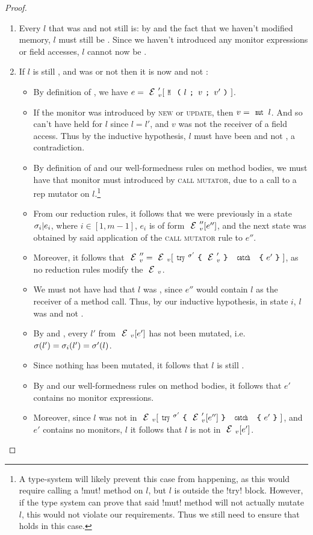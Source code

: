 \begin{proof}
\begin{ienumerate}
\begin{enumerate}
		\item Every \reach $l$ that was \RCN and not \RM still is: 
			by  and the fact that we haven't modified memory, $l$ must still be \RCN. Since we haven't introduced any monitor expressions or field accesses, $l$ cannot now be \RM.
		
		\item If $l$ is still \reach, and was \RM or not \RCN then it is now \RCN and not \RM:
		\begin{itemize}
			\item By definition of \error, we have $e = \EV'[\M{l}{v}{v'}]$.
			
			\item If the monitor was introduced by \textsc{new} or \textsc{update}, then $v = \Kw{mut}\,l$. And so \HNO can't have held for $l$ since $l = l'$, and $v$ was not the receiver of a field access.
			Thus by the inductive hypothesis, $l$ must have been \RCN and not \RM, a contradiction.
			\item By definition of \VS and our well-formedness rules on method bodies, we must have that monitor must introduced by \textsc{call mutator}, due to a call to a rep mutator on $l$.\footnote{
				A type-system will likely prevent this case from happening, 
				as this would require calling a \Q!mut! method on $l$, but $l$ is \reach outside the \Q!try! block. However, if the type system can prove that said \Q!mut! method will not actually mutate $l$, this would not violate our requirements.
				Thus we still need to ensure that  holds in this case.}
			\item From our reduction rules, it follows that we were previously in a state $\sigma_i|e_i$, where $i \in [1, m - 1]$, $e_i$ is of form $\EV''[e'']$, and the next state was obtained by said application of the \textsc{call mutator} rule to $e''$.
			\item Moreover, it follows that $\EV''= \EV[\trys{\s'}{\EV'}{e'}]$, as no reduction rules modify the $\EV$.
			\item We must not have had that $l$ was \HNO, since $e''$ would contain $l$ as the receiver of a method call. Thus, by our inductive hypothesis, in state $i$, $l$ was \RCN and not \RM.
		
			\item By  and , every $l'$ \reach from $\EV[e']$ has not been mutated, i.e. $\sigma(l') = \sigma_i(l') = \sigma'(l)$.
			\item Since nothing \reach has been mutated, it follows that $l$ is still \RCN.
			\item By \VS and our well-formedness rules on method bodies, it follows that $e'$ contains no monitor expressions.
			\item Moreover, since $l$ was not \RM in $\EV[\trys{\s'}{\EV'[e'']}{e'}]$, and $e'$ contains no monitors, $l$ it follows that $l$ is not \RM in $\EV[e']$.
		\end{itemize}


\end{enumerate}
\end{ienumerate}
\end{proof}
